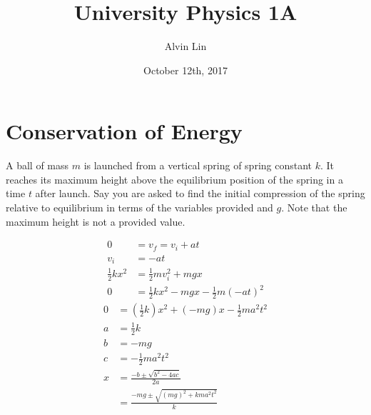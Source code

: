 \documentclass[letterpaper, 12pt]{math}
\title{University Physics 1A}
\author{Alvin Lin}
\date{October 12th, 2017}
\begin{document}
\maketitle

\section*{Conservation of Energy}
A ball of mass \( m \) is launched from a vertical spring of spring
constant \( k \). It reaches its maximum height above the equilibrium
position of the spring in a time \( t \) after launch. Say you are asked to
find the initial compression of the spring relative to equilibrium in terms
of the variables provided and \( g \). Note that the maximum height is not a
provided value.
\begin{center}
\end{center}
\begin{align*}
  0 &= v_f = v_i+at \\
  v_i &= -at \\
  \frac{1}{2}kx^2 &= \frac{1}{2}mv_i^2+mgx \\
  0 &= \frac{1}{2}kx^2-mgx-\frac{1}{2}m(-at)^2
\end{align*}
\begin{align*}
  0 &= \left(\frac{1}{2}k\right)x^2+(-mg)x-\frac{1}{2}ma^2t^2 \\
  a &= \frac{1}{2}k \\
  b &= -mg \\
  c &= -\frac{1}{2}ma^2t^2 \\
  x &= \frac{-b\pm\sqrt{b^2-4ac}}{2a} \\
  &= \frac{-mg\pm\sqrt{(mg)^2+kma^2t^2}}{k}
\end{align*}
\end{document}
